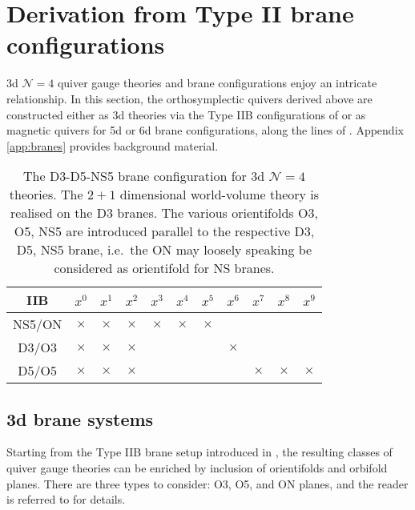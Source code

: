 \documentclass[a4paper,11pt]{article}
\newcommand{\Ncal}{\mathcal{N}}
\begin{document}
\section{Derivation from Type II brane configurations}
\label{branes}
3d $\Ncal=4$ quiver gauge theories and brane configurations enjoy an intricate relationship. In this section, the orthosymplectic quivers derived above are constructed either as 3d theories via the Type IIB configurations of \cite{Hanany:1996ie} or as magnetic quivers for 5d or 6d brane configurations, along the lines of \cite{Cabrera:2018jxt,Cabrera:2019izd,Cabrera:2019dob,Bourget:2020gzi,Akhond:2020vhc,Akhond:2021knl}. Appendix \ref{app:branes} provides background material.

\begin{table}[t]
\centering
\begin{tabular}{c|cccccccccc}
\toprule
     IIB & $x^0$ & $x^1$& $x^2$& $x^3$& $x^4$& $x^5$& $x^6$& $x^7$& $x^8$& $x^9$ \\ \midrule
    NS5/ON & $\times$ & $\times$& $\times$& $\times$& $\times$& $\times$ & & & & \\
    D3/O3 & $\times$ & $\times$& $\times$& & &  & $\times$ & & & \\
    D5/O5 & $\times$ & $\times$& $\times$ & & & & & $\times$& $\times$& $\times$ \\  \bottomrule 
\end{tabular}
\caption{The D3-D5-NS5 brane configuration for 3d $\Ncal=4$ theories. The $2+1$ dimensional world-volume theory is realised on the D3 branes. The various orientifolds O3, O5, NS5 are introduced parallel to the respective D3, D5, NS5 brane, i.e.\ the ON may loosely speaking be considered as orientifold for NS branes.}
\label{tab:branes}
\end{table}

\subsection{3d brane systems}
\label{sec:branes_3d}
Starting from the Type IIB brane setup introduced in \cite{Hanany:1996ie}, the resulting classes of quiver gauge theories can be enriched by inclusion of orientifolds and orbifold planes. There are three types to consider: O3, O5, and ON planes, and the reader is referred to \cite{Uranga:1998uj,Gimon:1996rq,Hanany:1997gh,Kapustin:1998fa,Hanany:1999sj,Feng:2000eq,Gaiotto:2008ak} for details.
% 
\end{document}
